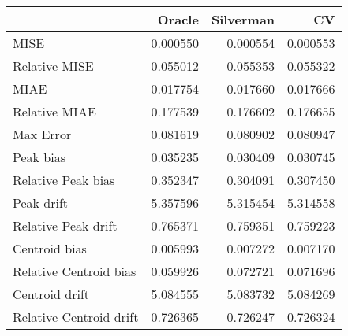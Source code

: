 \begin{tabular}{lrrr}
  \hline
 & Oracle & Silverman & CV \\ 
  \hline
MISE & 0.000550 & 0.000554 & 0.000553 \\ 
  Relative MISE & 0.055012 & 0.055353 & 0.055322 \\ 
  MIAE & 0.017754 & 0.017660 & 0.017666 \\ 
  Relative MIAE & 0.177539 & 0.176602 & 0.176655 \\ 
  Max Error & 0.081619 & 0.080902 & 0.080947 \\ 
  Peak bias & 0.035235 & 0.030409 & 0.030745 \\ 
  Relative Peak bias & 0.352347 & 0.304091 & 0.307450 \\ 
  Peak drift & 5.357596 & 5.315454 & 5.314558 \\ 
  Relative Peak drift & 0.765371 & 0.759351 & 0.759223 \\ 
  Centroid bias & 0.005993 & 0.007272 & 0.007170 \\ 
  Relative Centroid bias & 0.059926 & 0.072721 & 0.071696 \\ 
  Centroid drift & 5.084555 & 5.083732 & 5.084269 \\ 
  Relative Centroid drift & 0.726365 & 0.726247 & 0.726324 \\ 
   \hline
\end{tabular}
